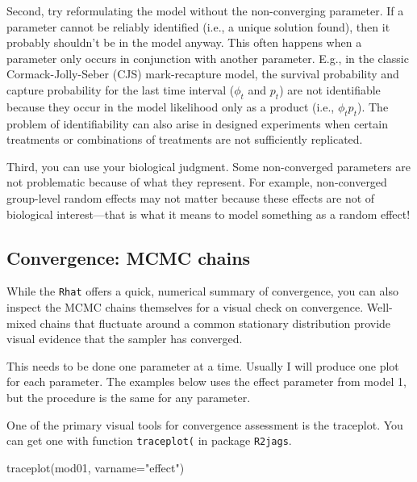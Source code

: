\documentclass[
  13,
  letterpaper,
]{report}
\newenvironment{Shaded}{\begin{snugshade}}{\end{snugshade}}
\newcommand{\AttributeTok}[1]{\textcolor[rgb]{0.40,0.45,0.13}{#1}}
\newcommand{\FunctionTok}[1]{\textcolor[rgb]{0.28,0.35,0.67}{#1}}
\newcommand{\NormalTok}[1]{\textcolor[rgb]{0.00,0.23,0.31}{#1}}
\newcommand{\StringTok}[1]{\textcolor[rgb]{0.13,0.47,0.30}{#1}}
\begin{document}
Second, try reformulating the model without the non-converging
parameter. If a parameter cannot be reliably identified (i.e., a unique
solution found), then it probably shouldn't be in the model anyway. This
often happens when a parameter only occurs in conjunction with another
parameter. E.g., in the classic Cormack-Jolly-Seber (CJS) mark-recapture
model, the survival probability and capture probability for the last
time interval (\(\phi_t\) and \(p_t\)) are not identifiable because they
occur in the model likelihood only as a product (i.e., \(\phi_tp_t\)).
The problem of identifiability can also arise in designed experiments
when certain treatments or combinations of treatments are not
sufficiently replicated.

Third, you can use your biological judgment. Some non-converged
parameters are not problematic because of what they represent. For
example, non-converged group-level random effects may not matter because
these effects are not of biological interest---that is what it means to
model something as a random effect!

\subsection{Convergence: MCMC chains}\label{convergence-mcmc-chains}

While the \texttt{Rhat} offers a quick, numerical summary of
convergence, you can also inspect the MCMC chains themselves for a
visual check on convergence. Well-mixed chains that fluctuate around a
common stationary distribution provide visual evidence that the sampler
has converged.

This needs to be done one parameter at a time. Usually I will produce
one plot for each parameter. The examples below uses the effect
parameter from model 1, but the procedure is the same for any parameter.

One of the primary visual tools for convergence assessment is the
traceplot. You can get one with function \texttt{traceplot(} in package
\texttt{R2jags}.

\begin{Shaded}
\begin{Highlighting}[]
\FunctionTok{traceplot}\NormalTok{(mod01, }\AttributeTok{varname=}\StringTok{"effect"}\NormalTok{)}
\end{Highlighting}
\end{Shaded}
\end{document}
